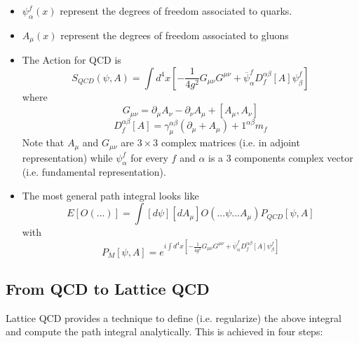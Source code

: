 \begin{itemize}
\item  $\psi _\alpha ^f(x)$ represent the degrees of freedom associated to
quarks.

\item  $A_\mu (x)$ represent the degrees of freedom associated to gluons

\item  The Action for QCD is 
\[
S_{QCD}(\psi ,A)=\int d^4x\left[ -\frac 1{4g^2}G_{\mu \nu }G^{\mu \nu }+%
\overline{\psi }_\alpha ^fD_f^{\alpha \beta }[A]\psi _\beta ^f\right] 
\]
where 
\[
G_{\mu \nu }=\partial _\mu A_\nu -\partial _\nu A_\mu +[A_\mu ,A_\nu ]
\]
\[
D_f^{\alpha \beta }[A]=\gamma _\mu ^{\alpha \beta }(\partial _\mu +A_\mu
)+1^{\alpha \beta }m_f
\]
Note that $A_\mu $ and $G_{\mu \nu }$ are $3\times 3$ complex matrices (i.e.
in adjoint representation) while $\psi _\alpha ^f$ for every $f$ and $\alpha 
$ is a $3$ components complex vector (i.e. fundamental representation).

\item  The most general path integral looks like 
\[
E[O(...)]=\int [d\psi ][dA_\mu ]O(...\psi ...A_\mu )P_{QCD}[\psi ,A]
\]
with 
\[
P_M[\psi ,A]=e^{i\int d^4x\left[ -\frac 1{4g^2}G_{\mu \nu }G^{\mu \nu }+%
\overline{\psi }_\alpha ^fD_f^{\alpha \beta }[A]\psi _\beta ^f\right] }
\]
\end{itemize}

\subsection{From QCD to Lattice QCD}

Lattice QCD provides a technique to define (i.e. regularize) the above
integral and compute the path integral analytically. This is achieved in
four steps:

